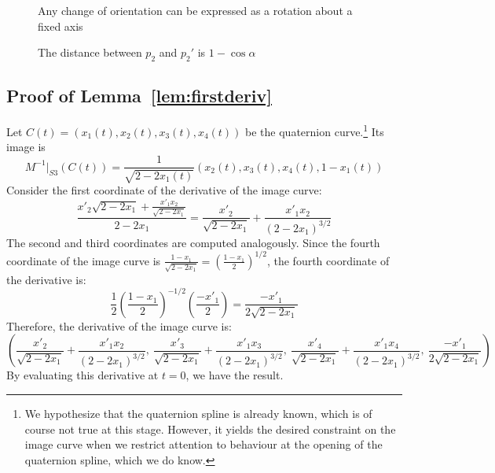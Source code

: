 \documentclass[12pt]{article}
\begin{document}
\begin{figure}
\vspace{2.5in}
\caption{Any change of orientation can be expressed as a rotation about a fixed axis}
\label{fig:eulerRotation}
\end{figure}

\begin{figure}
\vspace{2.5in}
\caption{The distance between $p_2$ and $p_2'$ is $1-\cos\alpha$}
\label{fig:QQdist}
\end{figure}

\subsection{Proof of Lemma~\ref{lem:firstderiv}}
\label{sec:firstderiv}

\prf
Let $C(t) = (x_1(t),x_2(t),x_3(t),x_4(t))$ be the quaternion curve.\footnote{We 
  hypothesize that the quaternion spline is already known,
  which is of course not true at this stage.
  However, it yields the desired constraint on the image curve when we restrict
  attention to behaviour at the opening of the quaternion spline, which we do know.}
Its image is 
\[
M^{-1}|_{S3}(C(t)) = \frac{1}{\sqrt{2-2x_1(t)}} (x_2(t),x_3(t),x_4(t),1-x_1(t))
\]
Consider the first coordinate of the derivative of the image curve:
\[
\frac{x'_2 \sqrt{2-2x_1} + \frac{x'_1 x_2}{\sqrt{2-2x_1}}}{2-2x_1}
= \frac{x'_2}{\sqrt{2-2x_1}} + \frac{x'_1x_2}{(2-2x_1)^{3/2}}
\]
The second and third coordinates are computed analogously.
Since the fourth coordinate of the image curve is
$\frac{1-x_1}{\sqrt{2-2x_1}} = (\frac{1-x_1}{2})^{1/2}$,
the fourth coordinate of the derivative is:
\[
\frac{1}{2} (\frac{1-x_1}{2})^{-1/2}(\frac{-x'_1}{2})
= \frac{-x'_1}{2\sqrt{2-2x_1}}
\]
Therefore, the derivative of the image curve is:
\[
(\frac{x'_2}{\sqrt{2-2x_1}} + \frac{x'_1x_2}{(2-2x_1)^{3/2}},\ 
 \frac{x'_3}{\sqrt{2-2x_1}} + \frac{x'_1x_3}{(2-2x_1)^{3/2}},\ 
 \frac{x'_4}{\sqrt{2-2x_1}} + \frac{x'_1x_4}{(2-2x_1)^{3/2}},\ 
 \frac{-x'_1}{2\sqrt{2-2x_1}}) 
\]
By evaluating this derivative at $t=0$, we have the result.
\QED
\end{document}
